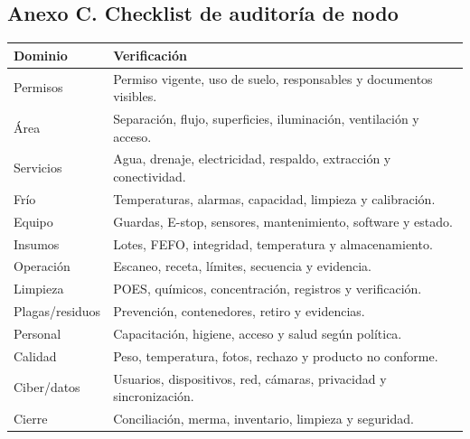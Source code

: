 \documentclass[11pt,a4paper]{article}
\begin{document}
\subsection*{Anexo C. Checklist de auditoría de nodo}
{\small
\begin{xltabular}{\textwidth}{@{}P{3.4cm}L@{}}
\toprule
\textbf{Dominio} & \textbf{Verificación}\\ \midrule
\endhead
Permisos & Permiso vigente, uso de suelo, responsables y documentos visibles.\\
Área & Separación, flujo, superficies, iluminación, ventilación y acceso.\\
Servicios & Agua, drenaje, electricidad, respaldo, extracción y conectividad.\\
Frío & Temperaturas, alarmas, capacidad, limpieza y calibración.\\
Equipo & Guardas, E-stop, sensores, mantenimiento, software y estado.\\
Insumos & Lotes, FEFO, integridad, temperatura y almacenamiento.\\
Operación & Escaneo, receta, límites, secuencia y evidencia.\\
Limpieza & POES, químicos, concentración, registros y verificación.\\
Plagas/residuos & Prevención, contenedores, retiro y evidencias.\\
Personal & Capacitación, higiene, acceso y salud según política.\\
Calidad & Peso, temperatura, fotos, rechazo y producto no conforme.\\
Ciber/datos & Usuarios, dispositivos, red, cámaras, privacidad y sincronización.\\
Cierre & Conciliación, merma, inventario, limpieza y seguridad.\\
\bottomrule
\end{xltabular}}
\end{document}
